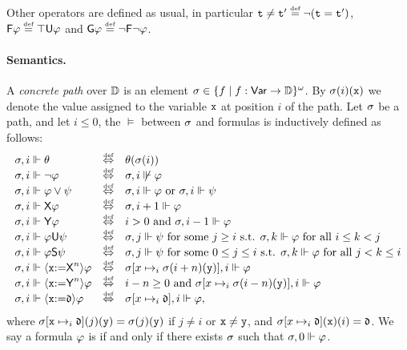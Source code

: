  Other operators are defined as usual, in particular $\aterm\neq \aterm'\egdef \neg(\aterm = \aterm')$, $\Eventually\aformula \egdef \top\Until\aformula$ and $\Always\aformula \egdef \neg\Eventually\neg\aformula$. 


\paragraph{Semantics.} A \emph{concrete path} over $\mathbb{D}$ is an element $\sigma\in\{f\mid f:{\rm \sf Var}\to\mathbb{D}\}^\omega$. By $\sigma(i)(\mathtt{x})$ we denote the value assigned to the variable $\mathtt{x}$ at position $i$ of the path.
Let $\sigma$ be a path, and let $i\leq 0$, the  $\models$ between $\sigma$ and formulas is inductively defined as follows:
\[
\begin{array}{lcl}
\apath,i \models \theta & \iffdef & \theta(\apath(i)) \\
\apath,i \models \neg\aformula & \iffdef & \apath,i \not\models\aformula \\
\apath,i \models \aformula\vee\aformulabis & \iffdef & \apath,i \models \aformula \mbox{ or } \apath,i \models \aformulabis \\
\apath,i \models \Next\aformula & \iffdef & \apath,i+1 \models \aformula \\ 
\apath,i \models \Prev\aformula & \iffdef & i>0 \mbox{ and } \apath,i-1 \models \aformula \\
\apath,i \models \aformula\Until\aformulabis & \iffdef & \apath,j \models \aformulabis \mbox{ for some } j\geq i \mbox{ s.t. } \apath,k \models \aformula \mbox{ for all } i\leq k < j \\
\apath,i \models \aformula\Since\aformulabis & \iffdef & \apath,j \models \aformulabis \mbox{ for some } 0\leq j \leq i \mbox{ s.t. } \apath,k \models \aformula \mbox{ for all } j< k \leq i \\
\apath,i \models \Assign{\avar}{\Nextn}\aformula & \iffdef & \apath[x\mapsto_i \apath(i+n)(\avarbis)],i \models \aformula \\ 
\apath,i \models \Assign{\avar}{\Prevn}\aformula & \iffdef & i-n\geq 0 \mbox{ and } \apath[x\mapsto_i \apath(i-n)(\avarbis)],i \models \aformula \\
\apath,i \models \Assign{\avar}{\adatum}\aformula & \iffdef & \apath[x\mapsto_i \adatum],i \models \aformula, \\ 
\end{array}
\]
where $\sigma[\mathtt{x}\mapsto_i \mathfrak{d}](j)(\mathtt{y})=\sigma(j)(\mathtt{y})$ if $j\neq i$  or $\mathtt{x}\neq\mathtt{y}$, and $\sigma[x\mapsto_i \mathfrak{d}](\mathtt{x})(i)  = \mathfrak{d}$. 
We say a formula $\varphi$ is  if and only if there exists $\sigma$ such that $\sigma,0\Vdash\varphi$.




